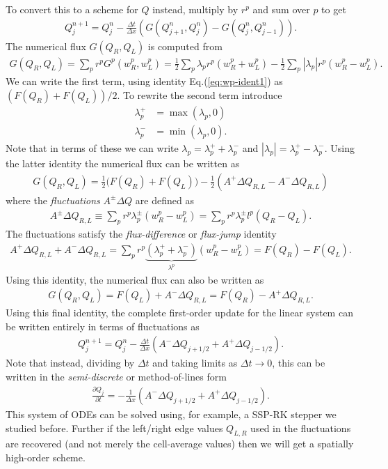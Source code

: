 \documentclass[12pt]{article}
\theoremstyle{definition}
\theoremstyle{definition}
\theoremstyle{definition}
\newcommand{\eqr}[1]{Eq.\thinspace(#1)}
\newcommand{\pfrac}[2]{\frac{\partial #1}{\partial #2}}
\begin{document}
To convert this to a scheme for $Q$ instead, multiply by $r^p$ and sum
over $p$ to get
\begin{align}
Q^{n+1}_j = Q^n_j - \frac{\Delta t}{\Delta x}\left(G(Q^n_{j+1},Q^n_{j}) - G(Q^n_{j},Q^n_{j-1})\right).
\end{align}
The numerical flux $G(Q_R,Q_L)$ is computed from
\begin{align}
G(Q_R,Q_L) = \sum_p r^p G^p(w_R^p,w_L^p) = \frac{1}{2} \sum_p \lambda_p r^p (w_R^p+w_L^p) 
- \frac{1}{2} \sum_p |\lambda_p| r^p (w_R^p-w_L^p).
\end{align}
We can write the first term, using identity \eqr{\ref{eq:wp-ident1}}
as $(F(Q_R)+F(Q_L))/2$. To rewrite the second term introduce
\begin{align}
\lambda_p^+ &= \max(\lambda_p,0) \\
\lambda_p^- &= \min(\lambda_p,0).
\end{align}
Note that in terms of these we can write
$\lambda_p = \lambda_p^+ + \lambda_p^-$ and
$|\lambda_p| = \lambda_p^+ - \lambda_p^-$. Using the latter identity
the numerical flux can be written as
\begin{align}
G(Q_R,Q_L) = \frac{1}{2}\big(F(Q_R)+F(Q_L)\big) - \frac{1}{2}(A^+\Delta Q_{R,L} - A^-\Delta Q_{R,L})
\end{align}
where the \emph{fluctuations} $A^\pm\Delta Q$ are defined as
\begin{align}
A^\pm\Delta Q_{R,L} \equiv \sum_p r^p \lambda^\pm_p (w_R^p-w_L^p) = \sum_p r^p \lambda^\pm_p l^p(Q_R-Q_L).
\end{align}
The fluctuations satisfy the \emph{flux-difference} or
\emph{flux-jump} identity
\begin{align}
A^+\Delta Q_{R,L} + A^-\Delta Q_{R,L} = 
\sum_p r^p \underbrace{(\lambda_p^+ + \lambda_p^-)}_{\lambda^p}
(w^p_R-w^p_L) = F(Q_R)-F(Q_L). \label{eq:flux-jump}
\end{align}
Using this identity, the numerical flux can also be written as
\begin{align}
G(Q_R,Q_L) = F(Q_L) + A^-\Delta Q_{R,L} = F(Q_R) - A^+\Delta Q_{R,L}.
\end{align}
Using this final identity, the complete first-order update for the
linear system can be written entirely in terms of fluctuations as
\begin{align}
Q^{n+1}_j = Q^n_j - \frac{\Delta t}{\Delta x}\left(A^-\Delta Q_{j+1/2} + A^+\Delta Q_{j-1/2}\right).
\end{align}
Note that instead, dividing by $\Delta t$ and taking limits as
$\Delta t \rightarrow 0$, this can be written in the
\emph{semi-discrete} or method-of-lines form
\begin{align}
  \pfrac{Q_j}{t} = - \frac{1}{\Delta x}\left(A^-\Delta Q_{j+1/2} + A^+\Delta Q_{j-1/2}\right).
\end{align}
This system of ODEs can be solved using, for example, a SSP-RK stepper
we studied before.  Further if the left/right edge values $Q_{L,R}$
used in the fluctuations are recovered (and not merely the
cell-average values) then we will get a spatially high-order scheme.
\end{document}
